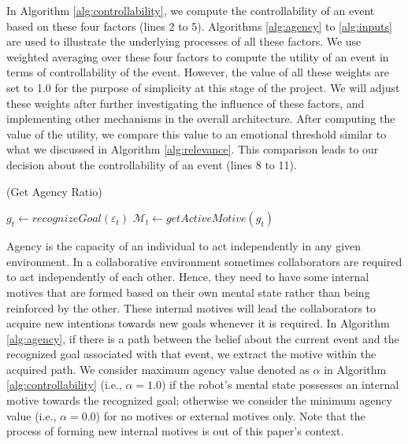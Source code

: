 \documentclass{aamas2016}
\begin{document}
In Algorithm \ref{alg:controllability}, we compute the controllability of an
event based on these four factors (lines 2 to 5). Algorithms \ref{alg:agency} to
\ref{alg:inputs} are used to illustrate the underlying processes of all these
factors. We use weighted averaging over these four factors to compute the
utility of an event in terms of controllability of the event. However, the
value of all these weights are set to 1.0 for the purpose of simplicity at
this stage of the project. We will adjust these weights after further
investigating the influence of these factors, and implementing other mechanisms
in the overall architecture. After computing the value of the utility, we
compare this value to an emotional threshold similar to what we discussed in
Algorithm \ref{alg:relevance}. This comparison leads to our decision about the
controllability of an event (lines 8 to 11).

\renewcommand\thealgorithm{4\alph{algorithm}}
\setcounter{algorithm}{0}

\begin{algorithm}
	\caption{(Get Agency Ratio)}
	\label{alg:agency}
	\begin{algorithmic}[1]
			\Statex
			\State $\mathit{g}_{t} \gets \textit{recognizeGoal}{(\varepsilon_t)}$
			\Statex
			\State $\mathcal{M}_{t} \gets \textit{getActiveMotive}{(\mathit{g}_{t})}$
			\Statex
				 \State {}
				\Else
					\State {}
				\EndIf
			\Else
				\State {}
			\EndIf
		\EndFunction 
	\end{algorithmic}
\end{algorithm}

\vspace*{-3mm}
Agency is the capacity of an individual to act independently in any given
environment. In a collaborative environment sometimes collaborators are required
to act independently of each other. Hence, they need to have some internal motives
that are formed based on their own mental state rather than being reinforced by
the other. These internal motives will lead the collaborators to acquire new
intentions towards new goals whenever it is required. In Algorithm
\ref{alg:agency}, if there is a path between the belief about the current event
and the recognized goal associated with that event, we extract the motive within
the acquired path. We consider maximum agency value denoted as $\alpha$ in
Algorithm \ref{alg:controllability} (i.e., $\alpha=1.0$) if the robot's mental
state possesses an internal motive towards the recognized goal; otherwise we
consider the minimum agency value (i.e., $\alpha=0.0$) for no motives or
external motives only. Note that the process of forming new internal motives is
out of this paper's context.
\end{document}
